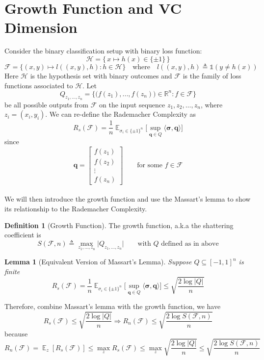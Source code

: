 \documentclass[11pt]{article}
\newtheorem{lemma}{Lemma}
\theoremstyle{definition}
\newtheorem{definition}{Definition}
\theoremstyle{remark}
\DeclareMathOperator{\E}{\mathbb{E}}
\begin{document}
\section{Growth Function and VC Dimension} 
Consider the binary classification setup with binary loss function:
\[
\mathcal{H} = \{ \, x \longmapsto h (x) \in \{\pm 1\}\,\}
\]
\[
\mathcal{F}=\{(x,y)\longmapsto l((x,y),h): h\in\mathcal{H}\} \quad \text{where}\quad l((x,y),h) \triangleq \mathds{1}(y \neq h(x))
\]
Here $\mathcal{H}$ is the hypothesis set with binary outcomes and $\mathcal{F}$ is the family of loss functions associated to $\mathcal{H}$. Let 
\[
Q_{z_1,...,z_n}=\{\big(f(z_1),...,f(z_n)\big) \in \mathbb{R}^n : f\in \mathcal{F}\}
\]
be all possible outputs from $\mathcal{F}$ on the input sequence $z_1, z_2, \dots, z_n$, where $z_i = (x_i, y_i)$. We can re-define the Rademacher Complexity as
\[
R_s(\mathcal{F}) = \frac{1}{n}\E_{\sigma_i \in \{\pm 1\}^n}
\bigg[\sup \limits_{\bm{q}\in Q} \langle \bm{\sigma}, \bm{q} \rangle \bigg]
\]
since
\[\bm{q} = \begin{bmatrix}
f(z_1) \\ f(z_2) \\ \vdots \\ f(z_n)
\end{bmatrix} \qquad \text{for some } f \in \mathcal{F}
\]
\\
We will then introduce the growth function and use the Massart's lemma to show its relationship to the Rademacher Complexity.\\
\begin{definition}[Growth Function]
The growth function, a.k.a the shattering coefficient is
\[ S(\mathcal{F}, n) \triangleq \max\limits_{z_1, \dots, z_n} \bigg| Q_{z_1, \dots, z_n}\bigg| \qquad \text{with $Q$ defined as in above} \]
\end{definition}
\begin{lemma}[Equivalent Version of Massart's Lemma]
Suppose $Q \subseteq [-1,1]^n$ is finite
\[
R_s(\mathcal{F}) = \frac{1}{n}\E_{\sigma_i \in \{\pm 1\}^n}
\bigg[\sup \limits_{\bm{q}\in Q} \langle \bm{\sigma}, \bm{q} \rangle \bigg] \leq \sqrt{\frac{2\log |Q|}{n}}
\]
\end{lemma}
Therefore, combine Massart's lemma with the growth function, we have
\begin{equation}
R_s(\mathcal{F}) \leq \sqrt{\frac{2\log{|Q|}}{n}} \Longrightarrow R_n(\mathcal{F}) \leq \sqrt{\frac{2\log {S(\mathcal{F}, n)} }{n}}
\end{equation}
because
\[R_n(\mathcal{F}) = \E_{z}[R_s(\mathcal{F})] \leq \max_{z} R_s(\mathcal{F}) \leq \max_{z}\sqrt{\frac{2\log{|Q|}}{n}} \leq \sqrt{\frac{2\log {S(\mathcal{F}, n)} }{n}} \]
\end{document}
